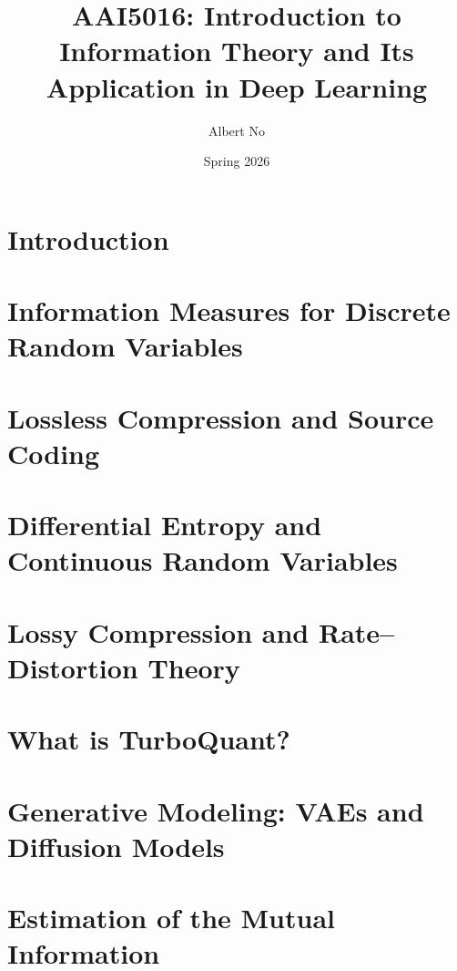\documentclass{article}
\title{AAI5016: Introduction to Information Theory and Its Application in Deep Learning}
\author{Albert No}
\date{Spring 2026}
\numberwithin{equation}{section}
\begin{document}
\maketitle
\tableofcontents
\newpage

\section{Introduction}



\section{Information Measures for Discrete Random Variables}


\section{Lossless Compression and Source Coding}


\section{Differential Entropy and Continuous Random Variables}


\section{Lossy Compression and Rate--Distortion Theory}


\section{What is TurboQuant?}


\section{Generative Modeling: VAEs and Diffusion Models}


\section{Estimation of the Mutual Information}

\end{document}
